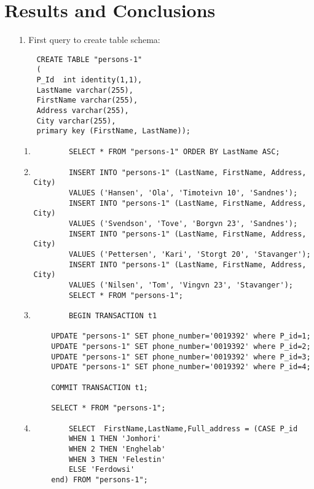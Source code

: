 \documentclass{article}
\begin{document}
\section{Results and Conclusions}
\begin{enumerate}
	\item[1.]
		First query to create table schema:
	\begin{verbatim}
	CREATE TABLE "persons-1"
	(
	P_Id  int identity(1,1),
	LastName varchar(255),
	FirstName varchar(255),
	Address varchar(255),
	City varchar(255),
	primary key (FirstName, LastName));
	\end{verbatim}

	\begin{enumerate}
	\item
    	\begin{verbatim}
    	SELECT * FROM "persons-1" ORDER BY LastName ASC;
    	\end{verbatim}
    	\item
    	\begin{verbatim}
    	INSERT INTO "persons-1" (LastName, FirstName, Address, City)
		VALUES ('Hansen', 'Ola', 'Timoteivn 10', 'Sandnes');
    	INSERT INTO "persons-1" (LastName, FirstName, Address, City)
		VALUES ('Svendson', 'Tove', 'Borgvn 23', 'Sandnes');
    	INSERT INTO "persons-1" (LastName, FirstName, Address, City)
		VALUES ('Pettersen', 'Kari', 'Storgt 20', 'Stavanger');
    	INSERT INTO "persons-1" (LastName, FirstName, Address, City)
		VALUES ('Nilsen', 'Tom', 'Vingvn 23', 'Stavanger');
    	SELECT * FROM "persons-1";
   	\end{verbatim}
    	\item
	\begin{verbatim}
    	BEGIN TRANSACTION t1

	UPDATE "persons-1" SET phone_number='0019392' where P_id=1;
	UPDATE "persons-1" SET phone_number='0019392' where P_id=2;
	UPDATE "persons-1" SET phone_number='0019392' where P_id=3;
	UPDATE "persons-1" SET phone_number='0019392' where P_id=4;

	COMMIT TRANSACTION t1;

	SELECT * FROM "persons-1";
	\end{verbatim}

    \item

    \begin{verbatim}
    	SELECT  FirstName,LastName,Full_address = (CASE P_id
		WHEN 1 THEN 'Jomhori'
		WHEN 2 THEN 'Enghelab'
		WHEN 3 THEN 'Felestin'
		ELSE 'Ferdowsi'
	end) FROM "persons-1";
    \end{verbatim}


\end{enumerate}
\end{enumerate}
\end{document}
